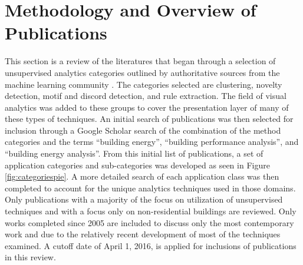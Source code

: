 \section{Methodology and Overview of Publications}
\label{overviewofpubs}

This section is a review of the literatures that began through a selection of unsupervised analytics categories outlined by authoritative sources from the machine learning community \citep{hastie_elements_2009,james_introduction_2013,duda_pattern_2012,mirkin_clustering:_2012}. The categories selected are clustering, novelty detection, motif and discord detection, and rule extraction. The field of visual analytics was added to these groups to cover the presentation layer of many of these types of techniques. An initial search of publications was then selected for inclusion through a Google Scholar search of the combination of the method categories and the terms ``building energy'', ``building performance analysis'', and ``building energy analysis''. From this initial list of publications, a set of application categories and sub-categories was developed as seen in Figure \ref{fig:categoriespie}. A more detailed search of each application class was then completed to account for the unique analytics techniques used in those domains. Only publications with a majority of the focus on utilization of unsupervised techniques and with a focus only on non-residential buildings are reviewed. Only works completed since 2005 are included to discuss only the most contemporary work and due to the relatively recent development of most of the techniques examined. A cutoff date of April 1, 2016, is applied for inclusions of publications in this review.